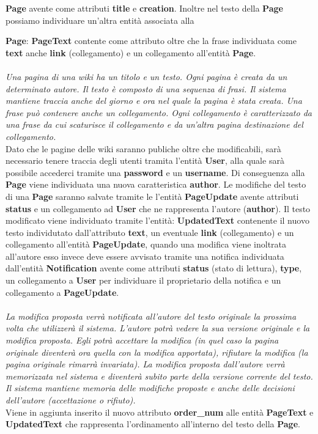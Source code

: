 \documentclass{article}
\begin{document}
	{\textbf {Page}} avente come attributi {\textbf {title}} e {\textbf {creation}}. Inoltre nel testo della {\textbf {Page}} possiamo individuare un'altra entità associata alla {\textbf {Page}: {\textbf {PageText}} contente come attributo oltre che la frase individuata come {\textbf {text}} anche {\textbf {link}} (collegamento) e un collegamento all'entità \textbf{Page}.\\ \\
	{\itshape Una pagina di una wiki ha un titolo e un testo. Ogni pagina è creata da un determinato autore. Il testo è
		composto di una sequenza di frasi. Il sistema mantiene traccia anche del giorno e ora nel quale la pagina è
		stata creata. Una frase può contenere anche un collegamento. Ogni collegamento è caratterizzato da una
		frase da cui scaturisce il collegamento e da un’altra pagina destinazione del collegamento.}
	\vspace{0.5cm}
	\\
	Dato che le pagine delle wiki saranno publiche oltre che modificabili, sarà necessario tenere traccia degli utenti tramita l'entità {\textbf {User}}, alla quale sarà possibile accederci tramite una {\textbf {password}} e un {\textbf {username}}. Di conseguenza alla {\textbf {Page} viene individuata una nuova caratteristica {\textbf {author}}. Le modifiche del testo di una {\textbf {Page}} saranno salvate tramite le l'entità {\textbf {PageUpdate}} avente attributi {\textbf {status}} e un collegamento ad \textbf{User} che ne rappresenta l'autore ({\textbf {author}}}). Il testo modificato viene individuato tramite l'entità: {\textbf {UpdatedText}} contenente il nuovo testo individutato dall'attributo \textbf{text}, un eventuale \textbf{link} (collegamento) e un collegamento all'entità \textbf{PageUpdate}, quando una modifica viene inoltrata all'autore esso invece deve essere avvisato tramite una notifica individuata dall'entità {\textbf {Notification}} avente come attributi {\textbf {status}} (stato di lettura), {\textbf {type}}, un collegamento a {\textbf{User}} per individuare il proprietario della notifica e un collegamento a \textbf{PageUpdate}. \\ \\
	{\itshape La modifica proposta verrà notificata all’autore del testo originale la prossima volta che utilizzerà il sistema.
		L’autore potrà vedere la sua versione originale e la modifica proposta. Egli potrà accettare la modifica (in
		quel caso la pagina originale diventerà ora quella con la modifica apportata), rifiutare la modifica (la pagina
		originale rimarrà invariata). La modifica proposta dall’autore verrà memorizzata nel sistema e diventerà
		subito parte della versione corrente del testo. Il sistema mantiene memoria delle modifiche proposte e anche
		delle decisioni dell’autore (accettazione o rifiuto).}
	\vspace{0.5cm}
	\\
	Viene in aggiunta inserito il nuovo attributo \textbf{order\_num} alle entità {\textbf {PageText}} e {\textbf {UpdatedText}} che rappresenta l'ordinamento all'interno del testo della {\textbf {Page}}.
	
}
\end{document}
